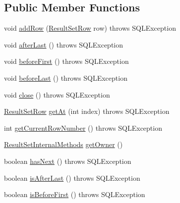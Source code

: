 \subsection*{Public Member Functions}
\begin{DoxyCompactItemize}
\item 
void \mbox{\hyperlink{interfacecom_1_1mysql_1_1jdbc_1_1_row_data_ac44d5df9c92d845272df5a13f15b9de7}{add\+Row}} (\mbox{\hyperlink{classcom_1_1mysql_1_1jdbc_1_1_result_set_row}{Result\+Set\+Row}} row)  throws S\+Q\+L\+Exception
\item 
void \mbox{\hyperlink{interfacecom_1_1mysql_1_1jdbc_1_1_row_data_a465a997f2fddb9de5ee12340944084fc}{after\+Last}} ()  throws S\+Q\+L\+Exception
\item 
void \mbox{\hyperlink{interfacecom_1_1mysql_1_1jdbc_1_1_row_data_a3c1836b8c63ae7d859b8b0f1613ef244}{before\+First}} ()  throws S\+Q\+L\+Exception
\item 
void \mbox{\hyperlink{interfacecom_1_1mysql_1_1jdbc_1_1_row_data_a64bc800ad28a97c6ad1f7d6a4958c187}{before\+Last}} ()  throws S\+Q\+L\+Exception
\item 
void \mbox{\hyperlink{interfacecom_1_1mysql_1_1jdbc_1_1_row_data_ac548da95fe41cee544964af3b6d734a6}{close}} ()  throws S\+Q\+L\+Exception
\item 
\mbox{\hyperlink{classcom_1_1mysql_1_1jdbc_1_1_result_set_row}{Result\+Set\+Row}} \mbox{\hyperlink{interfacecom_1_1mysql_1_1jdbc_1_1_row_data_a25cc7589897136ff05959212ce3e9063}{get\+At}} (int index)  throws S\+Q\+L\+Exception
\item 
int \mbox{\hyperlink{interfacecom_1_1mysql_1_1jdbc_1_1_row_data_aec8ec45fafa52ded12507aa708efbdf7}{get\+Current\+Row\+Number}} ()  throws S\+Q\+L\+Exception
\item 
\mbox{\hyperlink{interfacecom_1_1mysql_1_1jdbc_1_1_result_set_internal_methods}{Result\+Set\+Internal\+Methods}} \mbox{\hyperlink{interfacecom_1_1mysql_1_1jdbc_1_1_row_data_adb65eef9f8713ed4c3a1eb67eafaaf86}{get\+Owner}} ()
\item 
boolean \mbox{\hyperlink{interfacecom_1_1mysql_1_1jdbc_1_1_row_data_a630ce5b4cd86f8b4d7f71548797c4c16}{has\+Next}} ()  throws S\+Q\+L\+Exception
\item 
boolean \mbox{\hyperlink{interfacecom_1_1mysql_1_1jdbc_1_1_row_data_ab19688b6d0fbdc4e9b7589e099f28ff7}{is\+After\+Last}} ()  throws S\+Q\+L\+Exception
\item 
boolean \mbox{\hyperlink{interfacecom_1_1mysql_1_1jdbc_1_1_row_data_ae315d5317b29387492173d1e808b65d5}{is\+Before\+First}} ()  throws S\+Q\+L\+Exception

\end{DoxyCompactItemize}
